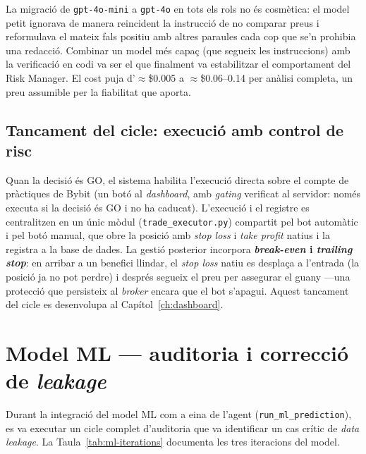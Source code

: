 \documentclass[12pt, a4paper]{report}
\begin{document}
\begin{infobox}
La migració de \texttt{gpt-4o-mini} a \texttt{gpt-4o} en tots els rols no és cosmètica: el model petit ignorava de manera reincident la instrucció de no comparar preus i reformulava el mateix fals positiu amb altres paraules cada cop que se'n prohibia una redacció. Combinar un model més capaç (que segueix les instruccions) amb la verificació en codi va ser el que finalment va estabilitzar el comportament del Risk Manager. El cost puja d'$\approx$\$0.005 a $\approx$\$0.06--0.14 per anàlisi completa, un preu assumible per la fiabilitat que aporta.
\end{infobox}

\subsection{Tancament del cicle: execució amb control de risc}

Quan la decisió és GO, el sistema habilita l'execució directa sobre el compte de pràctiques de Bybit (un botó al \textit{dashboard}, amb \emph{gating} verificat al servidor: només executa si la decisió és GO i no ha caducat). L'execució i el registre es centralitzen en un únic mòdul (\texttt{trade\_executor.py}) compartit pel bot automàtic i pel botó manual, que obre la posició amb \textit{stop loss} i \textit{take profit} natius i la registra a la base de dades. La gestió posterior incorpora \textbf{\textit{break-even} i \textit{trailing stop}}: en arribar a un benefici llindar, el \textit{stop loss} natiu es desplaça a l'entrada (la posició ja no pot perdre) i després segueix el preu per assegurar el guany ---una protecció que persisteix al \textit{broker} encara que el bot s'apagui. Aquest tancament del cicle es desenvolupa al Capítol~\ref{ch:dashboard}.

\section{Model ML --- auditoria i correcció de \textit{leakage}}

Durant la integració del model ML com a eina de l'agent (\texttt{run\_ml\_prediction}), es va executar un cicle complet d'auditoria que va identificar un cas crític de \textit{data leakage}. La Taula~\ref{tab:ml-iterations} documenta les tres iteracions del model.
\end{document}
